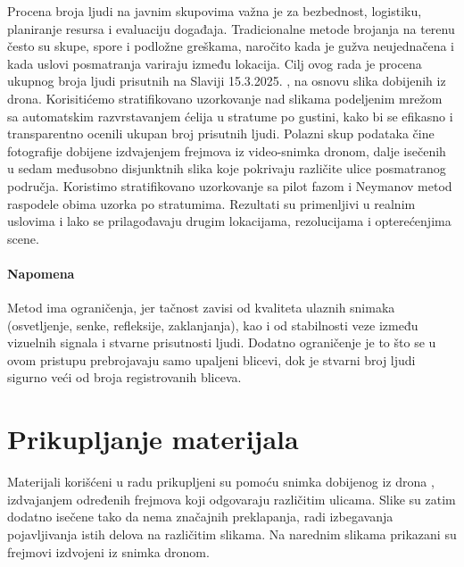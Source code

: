 \documentclass[a4paper,12pt]{article}
\begin{document}
Procena broja ljudi na javnim skupovima važna je za bezbednost, logistiku, planiranje resursa i evaluaciju događaja. Tradicionalne metode brojanja na terenu često su skupe, spore i podložne greškama, naročito kada je gužva neujednačena i kada uslovi posmatranja variraju između lokacija.
Cilj ovog rada je procena ukupnog broja ljudi prisutnih na Slaviji 15.3.2025. , na osnovu slika dobijenih iz drona. 
\newline
\newline
\noindent Korisitićemo stratifikovano uzorkovanje nad slikama podeljenim mrežom sa automatskim razvrstavanjem ćelija u stratume po gustini, kako bi se efikasno i transparentno ocenili ukupan broj prisutnih ljudi.
Polazni skup podataka čine fotografije dobijene izdvajenjem frejmova iz video-snimka dronom, dalje isečenih u sedam međusobno disjunktnih slika koje pokrivaju različite ulice posmatranog područja.
Koristimo stratifikovano uzorkovanje sa pilot fazom i Neymanov metod raspodele obima uzorka po stratumima.
\newline
\newline
\noindent Rezultati su primenljivi u realnim uslovima i lako se prilagođavaju drugim lokacijama, rezolucijama i opterećenjima scene.
\paragraph{Napomena}
Metod ima ograničenja, jer tačnost zavisi od kvaliteta ulaznih snimaka (osvetljenje, senke, refleksije, zaklanjanja), kao i od stabilnosti veze između vizuelnih signala i stvarne prisutnosti ljudi. Dodatno ograničenje je to što se u ovom pristupu prebrojavaju samo upaljeni blicevi, dok je stvarni broj ljudi sigurno veći od broja registrovanih bliceva.




\newpage
\section{Prikupljanje materijala}

Materijali korišćeni u radu prikupljeni su pomoću snimka dobijenog iz drona \cite{drone_video}, izdvajanjem određenih frejmova koji odgovaraju različitim ulicama. Slike su zatim dodatno isečene tako da nema značajnih preklapanja, radi izbegavanja pojavljivanja istih delova na različitim slikama.
Na narednim slikama prikazani su frejmovi izdvojeni iz snimka dronom.
\end{document}
